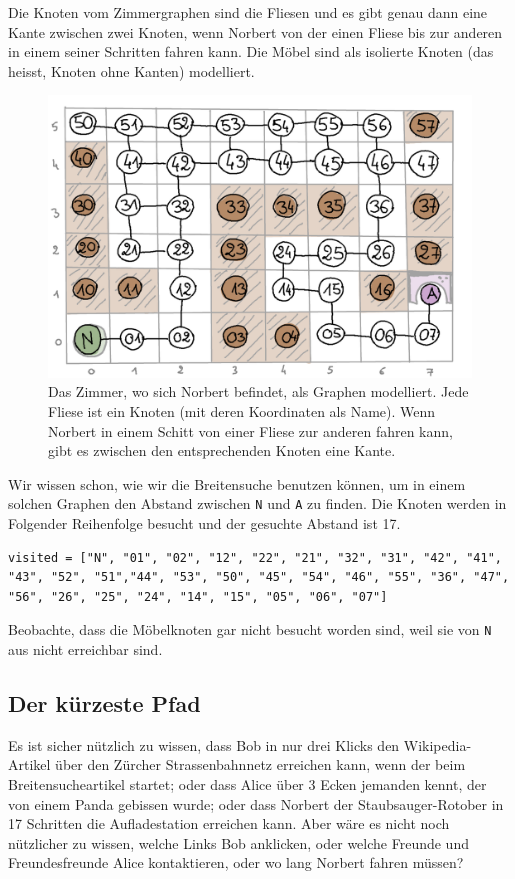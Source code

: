 Die Knoten vom Zimmergraphen sind die Fliesen und es gibt genau dann eine Kante zwischen zwei Knoten, wenn Norbert von der einen Fliese bis zur anderen in einem seiner Schritten fahren kann. Die Möbel sind als isolierte Knoten (das heisst, Knoten ohne Kanten) modelliert.
\begin{figure}[H]
    \centering
    \includegraphics[width=\textwidth]{Pictures/SP/norbert_graph.png}
    \caption{Das Zimmer, wo sich Norbert befindet, als Graphen modelliert. Jede Fliese ist ein Knoten (mit deren Koordinaten als Name). Wenn Norbert in einem Schitt von einer Fliese zur anderen fahren kann, gibt es zwischen den entsprechenden Knoten eine Kante.}
    \label{fig:norbert_graph}
\end{figure}
Wir wissen schon, wie wir die Breitensuche benutzen können, um in einem solchen Graphen den Abstand zwischen \texttt{N} und \texttt{A} zu finden.
Die Knoten werden in Folgender Reihenfolge besucht und der gesuchte Abstand ist 17.
\begin{lstlisting}
visited = ["N", "01", "02", "12", "22", "21", "32", "31", "42", "41", "43", "52", "51","44", "53", "50", "45", "54", "46", "55", "36", "47", "56", "26", "25", "24", "14", "15", "05", "06", "07"]
\end{lstlisting}
Beobachte, dass die Möbelknoten gar nicht besucht worden sind, weil sie von \texttt{N} aus nicht erreichbar sind.

\subsection{Der kürzeste Pfad}
Es ist sicher nützlich zu wissen, dass Bob in nur drei Klicks den Wikipedia-Artikel über den Zürcher Strassenbahnnetz erreichen kann, wenn der beim Breitensucheartikel startet; oder dass Alice über 3 Ecken jemanden kennt, der von einem Panda gebissen wurde; oder dass Norbert der Staubsauger-Rotober in 17 Schritten die Aufladestation erreichen kann. Aber wäre es nicht noch nützlicher zu wissen, welche Links Bob anklicken, oder welche Freunde und Freundesfreunde Alice kontaktieren, oder wo lang Norbert fahren müssen?

